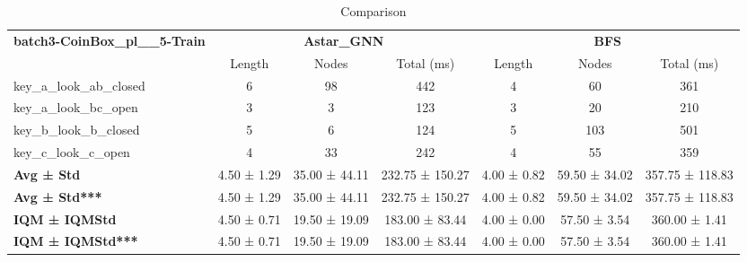 \begin{table}[!ht]
\centering
\small
\begin{tabular}{l|ccc|ccc}
\multirow{2}{*}{\textbf{batch3-CoinBox\_pl\_\_5-Train}} & \multicolumn{3}{c|}{\textbf{Astar\_GNN}} & \multicolumn{3}{c}{\textbf{BFS}} \\
\cline{2-7}
& Length & Nodes & Total (ms) & Length & Nodes & Total (ms) \\
\hline
key\_a\_look\_ab\_closed & 6 & 98 & 442 & 4 & 60 & 361 \\
key\_a\_look\_bc\_open & 3 & 3 & 123 & 3 & 20 & 210 \\
key\_b\_look\_b\_closed & 5 & 6 & 124 & 5 & 103 & 501 \\
key\_c\_look\_c\_open & 4 & 33 & 242 & 4 & 55 & 359 \\
\hline
\textbf{Avg ± Std} & 4.50 ± 1.29 & 35.00 ± 44.11 & 232.75 ± 150.27 & 4.00 ± 0.82 & 59.50 ± 34.02 & 357.75 ± 118.83 \\
\textbf{Avg ± Std***} & 4.50 ± 1.29 & 35.00 ± 44.11 & 232.75 ± 150.27 & 4.00 ± 0.82 & 59.50 ± 34.02 & 357.75 ± 118.83 \\
\textbf{IQM ± IQMStd} & 4.50 ± 0.71 & 19.50 ± 19.09 & 183.00 ± 83.44 & 4.00 ± 0.00 & 57.50 ± 3.54 & 360.00 ± 1.41 \\
\textbf{IQM ± IQMStd***} & 4.50 ± 0.71 & 19.50 ± 19.09 & 183.00 ± 83.44 & 4.00 ± 0.00 & 57.50 ± 3.54 & 360.00 ± 1.41 \\
\end{tabular}
\caption{Comparison}
\label{tab:batch3_CoinBox_pl__5_comparison_train}
\end{table}
